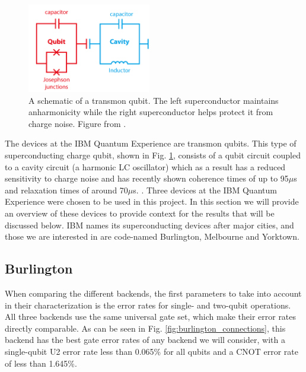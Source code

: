 \begin{figure}[h] \centering
\includegraphics[width=0.48\textwidth]{images/transmon_diagram.png}
  \caption{A schematic of a transmon qubit. The left superconductor maintains
anharmonicity while the right superconductor helps protect it from charge noise.
Figure from \cite{dickel20_how_to_make_artif_atoms}.}
  \label{fig:transmon}
\end{figure}

The devices at the IBM Quantum Experience are transmon qubits. This type of
superconducting charge qubit, shown in Fig. \ref{fig:transmon}, consists of a
qubit circuit coupled to a cavity circuit (a harmonic LC oscillator) which as a
result has a reduced sensitivity to charge noise and has recently shown
coherence times of up to 95$\mu$s and relaxation times of around 70$\mu$s.
\cite{koch07_charg_insen_qubit_desig_deriv,
rigetti12_super_qubit_waveg_cavit_with}. Three devices at the IBM Quantum
Experience were chosen to be used in this project. In this section we will
provide an overview of these devices to provide context for the results that
will be discussed below. IBM names its superconducting devices after major
cities, and those we are interested in are code-named Burlington, Melbourne and
Yorktown.

\subsection{Burlington} When comparing the different backends, the first
parameters to take into account in their characterization is the error rates for
single- and two-qubit operations. All three backends use the same universal gate
set, which make their error rates directly comparable. As can be seen in Fig.
\ref{fig:burlington_connections}, this backend has the best gate error rates of
any backend we will consider, with a single-qubit U2 error rate less than
0.065\% for all qubits and a CNOT error rate of less than 1.645\%.

